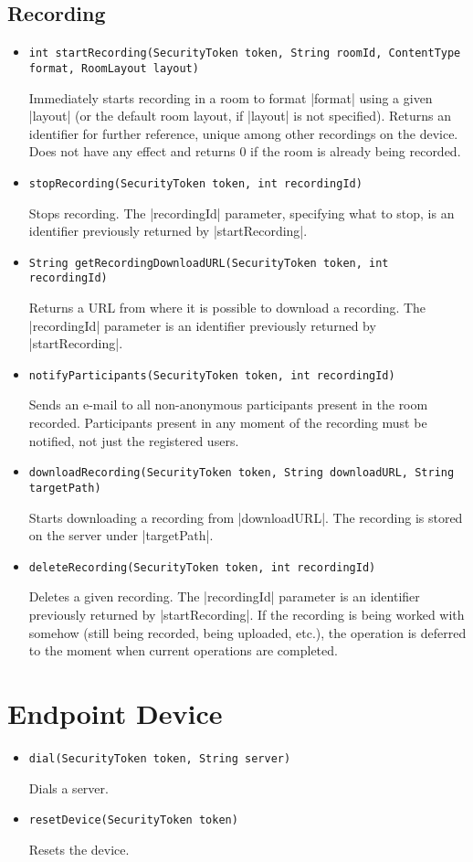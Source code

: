 \documentclass[a4paper]{report}
\newenvironment{Api}{\begin{itemize}}{\end{itemize}}
\newcommand{\ApiCode}[1]{\lstinline[style=styleApi]|#1|}
\newcommand{\ApiItem}[1]{\item #1 %

}
\newcommand{\ApiCmd}[1]{\ApiItem{\ApiCode{#1}}}
\begin{document}
\subsection{Recording}
\begin{Api}

\ApiCmd{int startRecording(SecurityToken token, String roomId, ContentType format, RoomLayout layout)}
Immediately starts recording in a room to format |format| using a given |layout| (or the default room layout, if |layout| is not specified). Returns an identifier for further reference, unique among other recordings on the device. Does not have any effect and returns 0 if the room is already being recorded.

\ApiCmd{stopRecording(SecurityToken token, int recordingId)}
Stops recording. The |recordingId| parameter, specifying what to stop, is an identifier previously returned by |startRecording|.

\ApiCmd{String getRecordingDownloadURL(SecurityToken token, int recordingId)}
Returns a URL from where it is possible to download a recording. The |recordingId| parameter is an identifier previously returned by |startRecording|.

\ApiCmd{notifyParticipants(SecurityToken token, int recordingId)}
Sends an e-mail to all non-anonymous participants present in the room recorded. Participants present in any moment of the recording must be notified, not just the registered users.

\ApiCmd{downloadRecording(SecurityToken token, String downloadURL, String targetPath)}
Starts downloading a recording from |downloadURL|. The recording is stored on the server under |targetPath|.

\ApiCmd{deleteRecording(SecurityToken token, int recordingId)}
Deletes a given recording. The |recordingId| parameter is an identifier previously returned by |startRecording|. If the recording is being worked with somehow (still being recorded, being uploaded, etc.), the operation is deferred to the moment when current operations are completed.

\end{Api}


\section{Endpoint Device} \label{sect:connector-endpoint-api}

\begin{Api}

\ApiCmd{dial(SecurityToken token, String server)}
Dials a server.

\ApiCmd{resetDevice(SecurityToken token)}
Resets the device.

\end{Api}
\end{document}
